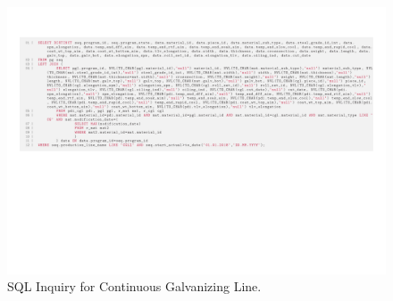 \begin{landscape}
	\begin{figure}[ht]
		\centering
		\includegraphics[width=1.4\textwidth]{../database_inquiries/CGL.pdf}
		\caption{SQL Inquiry for Continuous Galvanizing Line.}
		\label{figure-supplements-CGL-SQL}
	\end{figure}
\end{landscape}
